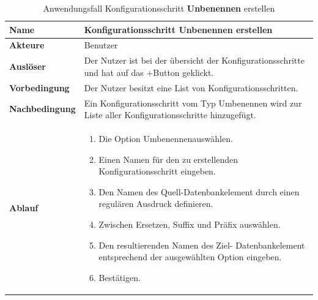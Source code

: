\begin{table}[H]
	\centering
	\begin{tabular}{ |p{4cm}|p{8cm}| }
		\hline
		\textbf{Name} &  Konfigurationsschritt Unbenennen erstellen \\
		\hline
		\textbf{Akteure} & Benutzer \\
		\hline
		\textbf{Auslöser} & Der Nutzer ist bei der übersicht der Konfigurationsschritte und hat auf das \glqq $+$\grqq Button geklickt. \\
		\hline
		\textbf{Vorbedingung} & Der Nutzer besitzt eine List von Konfigurationsschritten.  \\
		\hline
		\textbf{Nachbedingung} & Ein Konfigurationsschritt vom Typ Umbenennen wird zur Liste aller Konfigurationsschritte hinzugefügt.  \\
		\hline
		\textbf{Ablauf} & 
		\begin{enumerate}
			\item Die Option \glqq Umbenennen\grqq auswählen.
			\item Einen Namen für den zu erstellenden Konfigurationsschritt eingeben.
			\item Den Namen des Quell-Datenbankelement durch einen regulären Ausdruck definieren.
			\item Zwischen Ersetzen, Suffix und Präfix auswählen.
			\item Den resultierenden Namen des Ziel- Datenbankelement entsprechend der ausgewählten Option eingeben.
			\item Bestätigen.
		\end{enumerate}  \\
		\hline
		
	\end{tabular}
	\caption{Anwendungsfall Konfigurationsschritt \textbf{Unbenennen} erstellen}
	\label{table:umbenennen}
\end{table}




